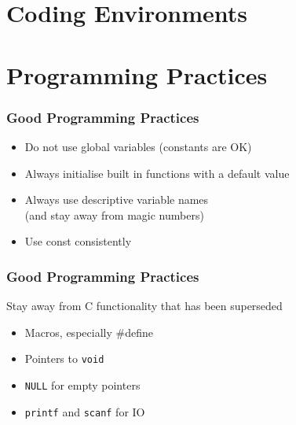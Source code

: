 \documentclass[14pt,a4paper,dvipsnames,usenames]{beamer}
\begin{document}
\section{Coding Environments}

\frame[plain]{\sectionpage}

\LiveFrame

\section{Programming Practices}

\frame[plain]{\sectionpage}

\begin{frame}[fragile]
  \frametitle{Good Programming Practices}

  \begin{itemize}
    \setlength\itemsep{0.5em}
    \item {\color{Marty}Do not} use global variables {\fontsize{9pt}{9pt}\selectfont (constants are OK)}
    \item {\color{FeebleWeek}Always} initialise built in functions with a default value
    \item {\color{FeebleWeek}Always} use descriptive variable names \\
      {\fontsize{9pt}{9pt}\selectfont (and stay away from magic numbers)}
    \item Use {\color{FeebleWeek}const} consistently
  \end{itemize}
  
\end{frame}

\begin{frame}[fragile]
  \frametitle{Good Programming Practices}

  Stay away from C functionality that has been superseded

  \vspace{.5em}
  \begin{itemize}
    \setlength\itemsep{0.5em}
    \item Macros, especially {\ttfamily\color{sorange}\#define}
    \item Pointers to \lstinline!void!
    \item \lstinline!NULL! for empty pointers
    \item \lstinline!printf! and \lstinline!scanf! for IO
  \end{itemize}

\end{frame}
\end{document}
